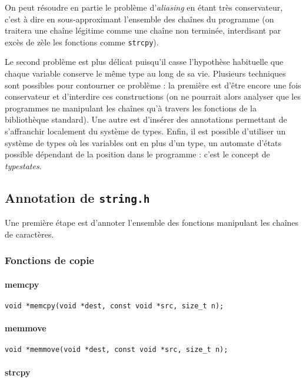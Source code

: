 On peut résoudre en partie le problème d'\emph{aliasing} en étant très
conservateur, c'est à dire en sous-approximant l'ensemble des chaînes du
programme (on traitera une chaîne légitime comme une chaîne non terminée,
interdisant par excès de zèle les fonctions comme \texttt{strcpy}).

Le second problème est plus délicat puisqu'il casse l'hypothèse habituelle que
chaque variable conserve le même type au long de sa vie. Plusieurs techniques
sont possibles pour contourner ce problème : la première est d'être encore une
fois conservateur et d'interdire ces constructions (on ne pourrait alors
analyser que les programmes ne manipulant les chaînes qu'à travers les fonctions
de la bibliothèque standard). Une autre est d'insérer des annotations permettant
de s'affranchir localement du système de types. Enfin, il est possible
d'utiliser un système de types où les variables ont en plus d'un type, un
automate d'états possible dépendant de la position dans le programme : c'est le
concept de \emph{typestates}\cite{tse12-typestate}.

\subsection{Annotation de \texttt{string.h}}

Une première étape est d'annoter l'ensemble des fonctions manipulant les chaînes
de caractères.

\subsubsection{Fonctions de copie}

\paragraph{memcpy}

\begin{Verbatim}
void *memcpy(void *dest, const void *src, size_t n);
\end{Verbatim}

\paragraph{memmove}

\begin{Verbatim}
void *memmove(void *dest, const void *src, size_t n);
\end{Verbatim}

\paragraph{strcpy}

